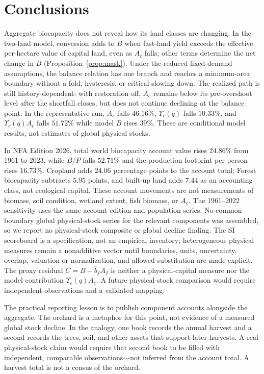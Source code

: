 \documentclass[preprint,12pt,authoryear]{elsarticle}
\newcommand{\Ups}{\Upsilon_c}
\begin{document}
\section{Conclusions}\label{sec:conclusions}

Aggregate biocapacity does not reveal how its land classes are changing. In the two-land model, conversion adds to $B$ when fast-land yield exceeds the effective per-hectare value of capital land, even as $A_c$ falls; other terms determine the net change in $B$ (Proposition~\ref{prop:mask}). Under the reduced fixed-demand assumptions, the balance relation has one branch and reaches a minimum-area boundary without a fold, hysteresis, or critical slowing down. The realized path is still history-dependent: with restoration off, $A_c$ remains below its pre-overshoot level after the shortfall closes, but does not continue declining at the balance point. In the representative run, $A_c$ falls $46.16\%$, $\Ups(q)$ falls $10.33\%$, and $\Ups(q)A_c$ falls $51.72\%$ while model $B$ rises $39\%$. These are conditional model results, not estimates of global physical stocks.

In NFA Edition 2026, total world biocapacity account value rises $24.86\%$ from 1961 to 2023, while $B/P$ falls $52.71\%$ and the production footprint per person rises $16.73\%$. Cropland adds $24.06$ percentage points to the account total; Forest biocapacity subtracts $5.95$ points, and built-up land adds $7.44$ as an accounting class, not ecological capital. These account movements are not measurements of biomass, soil condition, wetland extent, fish biomass, or $A_c$. The 1961--2022 sensitivity uses the same account edition and population series. No common-boundary global physical-stock series for the relevant components was assembled, so we report no physical-stock composite or global decline finding. The SI scoreboard is a specification, not an empirical inventory; heterogeneous physical measures remain a nonadditive vector until boundaries, units, uncertainty, overlap, valuation or normalization, and allowed substitution are made explicit. The proxy residual $C=B-\hat b_fA_f$ is neither a physical-capital measure nor the model contribution $\Ups(q)A_c$. A future physical-stock comparison would require independent observations and a validated mapping.

The practical reporting lesson is to publish component accounts alongside the aggregate. The orchard is a metaphor for this point, not evidence of a measured global stock decline. In the analogy, one book records the annual harvest and a second records the trees, soil, and other assets that support later harvests. A real physical-stock claim would require that second book to be filled with independent, comparable observations—not inferred from the account total. A harvest total is not a census of the orchard.
\end{document}
